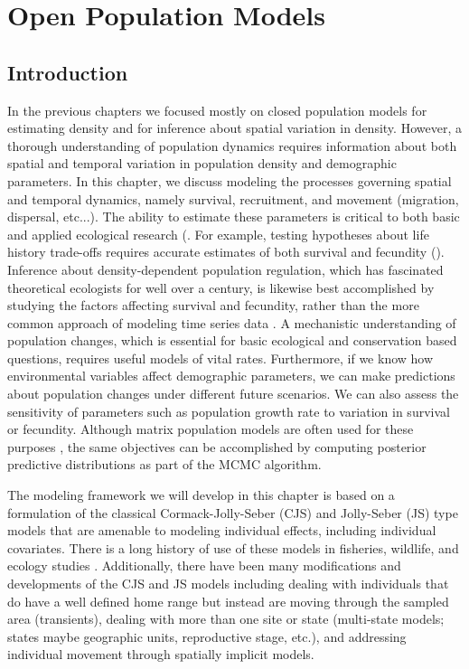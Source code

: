 \chapter{Open Population Models}
\label{chapt.open}


\vspace{0.3cm}


\section{Introduction}


In the previous chapters we focused mostly on
 closed population models for
estimating density and for inference about spatial variation in
density.  However, a thorough understanding of population dynamics
requires information about both spatial and temporal variation in
population density and demographic parameters.  In this chapter, we
discuss modeling
 the processes governing
spatial and temporal dynamics, namely survival, recruitment, and
movement (migration, dispersal, etc...).  The ability to estimate
these parameters is critical to both basic and applied ecological
research (\cite{knape_deValpine:2012}. For example, testing hypotheses
about life history trade-offs requires accurate estimates of both
survival and fecundity (\cite{caswell:1989, nichols_etal:1994}).
Inference about density-dependent population regulation, which has
fascinated theoretical ecologists for well over a century, is likewise
best accomplished by studying the factors affecting survival and
fecundity, rather than the more common approach of modeling time
series data \citep{nichols_etal:2000}.  A mechanistic understanding of
population changes, which is essential for basic ecological and
conservation based questions, requires useful models of vital
rates. Furthermore, if we know how environmental variables affect
demographic parameters, we can make predictions about population
changes under different future scenarios. We can also assess the
sensitivity of parameters such as population growth rate to variation
in survival or fecundity. Although matrix population models are often
used for these purposes \citep{caswell:1989,saether_bakke:2000}, the
same objectives can be accomplished by computing posterior predictive
distributions as part of the MCMC algorithm.

The modeling framework we will develop in this chapter is based on a
formulation of the classical Cormack-Jolly-Seber (CJS) and Jolly-Seber
(JS) type models \citep{cormack:1964, jolly:1965, seber:1965} that are
amenable to modeling individual effects, including individual
covariates.  There is a long history of use of these models in
fisheries, wildlife, and ecology studies \citep{pollock_etal:1990,
  lebreton_etal:1992, pradel:1996, williams_etal:2002,
  schwarz_arnason:2005, gimenez:2007}.  Additionally, there have been
many modifications and developments of the CJS and JS models including
dealing with individuals that do have a well defined home range but
instead are moving through the sampled area (transients), dealing with
more than one site or state (multi-state models; states maybe
geographic units, reproductive stage, etc.), and addressing individual
movement through spatially implicit models.


